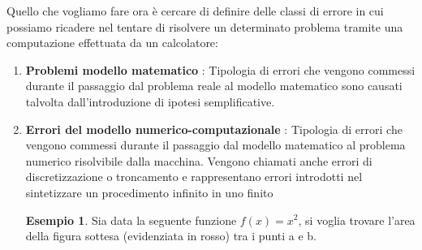 \documentclass[12pt, a4paper]{book}
\theoremstyle{definition}
\newtheorem{exmp}{Esempio}[section]
\begin{document}
\begin{flushleft}

Quello che vogliamo fare ora è cercare di definire delle classi di errore in cui possiamo ricadere nel tentare di risolvere un determinato problema tramite una computazione effettuata da un calcolatore:

\begin{enumerate}
  \item \textbf{Problemi modello matematico} : Tipologia di errori che vengono commessi durante il passaggio dal problema reale al modello matematico sono causati talvolta dall'introduzione di ipotesi semplificative. 
  
  	\begin{figure}[h]
		\centering
	\end{figure}

\item \textbf{Errori del modello numerico-computazionale} : Tipologia di errori che vengono commessi durante il passaggio dal modello matematico al  problema numerico risolvibile dalla macchina. Vengono chiamati anche errori di discretizzazione o troncamento e rappresentano errori introdotti nel sintetizzare un procedimento infinito in uno finito

\begin{figure}[h!]
		\centering
	\end{figure}
\begin{exmp}
Sia data la seguente funzione $ f(x) = x^2 $, si voglia trovare l'area della figura sottesa (evidenziata in rosso) tra i punti a e b.\\


\end{exmp}
\end{enumerate}
\end{flushleft}
\end{document}
